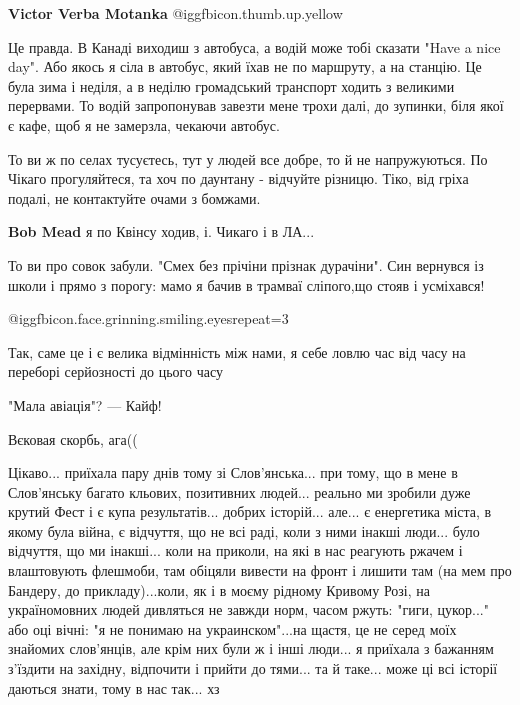 \begin{itemize}
\begin{itemize} %
\textbf{Victor Verba Motanka}  @igg{fbicon.thumb.up.yellow} 
\end{itemize} %


Це правда. В Канаді виходиш з автобуса, а водій може тобі сказати "Have a nice
day". Або якось я сіла в автобус, який їхав не по маршруту, а на станцію. Це
була зима і неділя, а в неділю громадський транспорт ходить з великими
перервами. То водій запропонував завезти мене трохи далі, до зупинки, біля якої
є кафе, щоб я не замерзла, чекаючи автобус.


То ви ж по селах тусуєтесь, тут у людей все добре, то й не напружуються. По
Чікаго прогуляйтеся, та хоч по даунтану - відчуйте різницю. Тіко, від гріха
подалі, не контактуйте очами з бомжами.

\begin{itemize} %
\textbf{Bob Mead} я по Квінсу ходив, і. Чикаго і в ЛА...
\end{itemize} %


То ви про совок забули. "Смех без прічіни прізнак дурачіни". Син вернувся із
школи і прямо з порогу: мамо я бачив в трамваї сліпого,що стояв і усміхався!


 @igg{fbicon.face.grinning.smiling.eyes}{repeat=3} 

Так, саме це і є велика відмінність між нами, я себе ловлю час від часу на переборі серйозності до цього часу

"Мала авіація"? — Кайф!

Вєковая скорбь, ага((


Цікаво... приїхала пару днів тому зі Слов'янська... при тому, що в мене в
Слов'янську багато кльових, позитивних людей... реально ми зробили дуже крутий
Фест і є купа результатів... добрих історій... але... є енергетика міста, в якому
була війна, є відчуття, що не всі раді, коли з ними інакші люди... було
відчуття, що ми інакші... коли на приколи, на які в нас реагують ржачем і
влаштовують флешмоби, там обіцяли вивести на фронт і лишити там (на мем про
Бандеру, до прикладу)...коли, як і в моєму рідному Кривому Розі, на
україномовних людей дивляться не завжди норм, часом ржуть: "гиги, цукор..." або
оці вічні: "я не понимаю на украинском"...на щастя, це не серед моїх знайомих
слов'янців, але крім них були ж і інші люди... я приїхала з бажанням з'їздити на
західну, відпочити і прийти до тями... та й таке... може ці всі історії даються
знати, тому в нас так... хз



\end{itemize}
